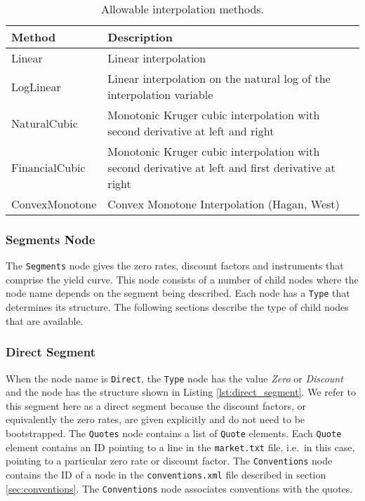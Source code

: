 \begin{table}[h]
\centering
  \begin{tabu} to 0.9\linewidth {| X[-1.5,l,m] | X[-5,l,m] |}
    \hline
    \bfseries{Method} & \bfseries{Description} \\
    \hline
    Linear & Linear interpolation \\ \hline
    LogLinear & Linear interpolation on the natural log of the interpolation variable \\ \hline
    NaturalCubic & Monotonic Kruger cubic interpolation with second derivative at left and right \\ \hline
    FinancialCubic & Monotonic Kruger cubic interpolation with second derivative at left and 
                     first derivative at right \\ \hline
    ConvexMonotone & Convex Monotone Interpolation (Hagan, West) \\ \hline
  \end{tabu}
  \caption{Allowable interpolation methods.}
  \label{tab:allow_interp_methods}
\end{table}
\subsubsection*{Segments Node} \label{ss:segments_node}
The \lstinline!Segments! node gives the zero rates, discount factors and instruments that comprise the yield curve. This
node consists of a number of child nodes where the node name depends on the segment being described. Each node has a
\lstinline!Type! that determines its structure. The following sections describe the type of child nodes that are
available.

\subsubsection*{Direct Segment}
When the node name is \lstinline!Direct!, the \lstinline!Type! node has the value \emph{Zero} or \emph{Discount} and the
node has the structure shown in Listing \ref{lst:direct_segment}. We refer to this segment here as a direct segment
because the discount factors, or equivalently the zero rates, are given explicitly and do not need to be
bootstrapped. The \lstinline!Quotes! node contains a list of \lstinline!Quote! elements. Each \lstinline!Quote! element
contains an ID pointing to a line in the {\tt market.txt} file, i.e.\ in this case, pointing to a particular zero rate
or discount factor. The \lstinline!Conventions! node contains the ID of a node in the {\tt conventions.xml} file
described in section \ref{sec:conventions}. The \lstinline!Conventions! node associates conventions with the quotes.

